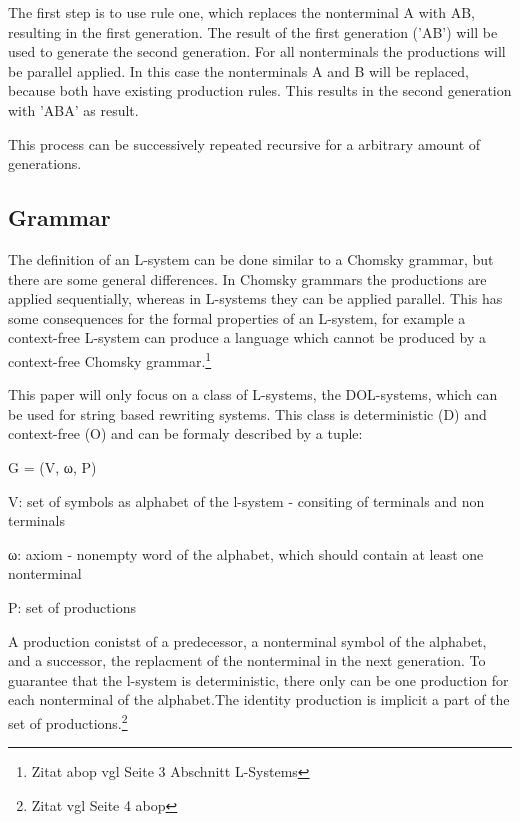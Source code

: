 \documentclass[english]{cpp-hmwk}
\begin{document}
The first step is to use rule one, which replaces the nonterminal A with AB, resulting in the first generation. The result of the first generation ('AB') will be used to generate the second generation.
For all nonterminals the productions will be parallel applied. In this case the nonterminals A and B will be replaced, because both have existing production rules. This results in the second generation with 'ABA' as result.

This process can be successively repeated recursive for a arbitrary amount of generations.







\subsection{Grammar}
\label{section:grammar}
The definition of an L-system can be done similar to a Chomsky grammar, but there are some general differences. In Chomsky grammars the productions are applied sequentially, whereas in L-systems they can be applied parallel. This has some consequences for the formal properties of an L-system, for example a context-free L-system can produce a language which cannot be produced by a context-free Chomsky grammar.\footnote{Zitat abop vgl Seite 3  Abschnitt L-Systems}

\noindent This paper will only focus on a class of L-systems, the DOL-systems, which can be used for string based rewriting systems. This class is deterministic (D) and context-free (O) and can be formaly described  by a tuple:

\begin{center}
G = (V, ω, P)
\end{center}

V: set of symbols as alphabet of the l-system - consiting of terminals and non terminals

ω: axiom - nonempty word of the alphabet, which should contain at least one nonterminal

P: set of productions

\medskip
\noindent A production conistst of a predecessor, a nonterminal symbol of the alphabet, and a successor, the replacment of the nonterminal in the next generation.
To guarantee that the l-system is deterministic, there only can be one production for each nonterminal of the alphabet.The identity production is implicit a part of the set of productions.\footnote{Zitat vgl Seite 4 abop}
\end{document}
